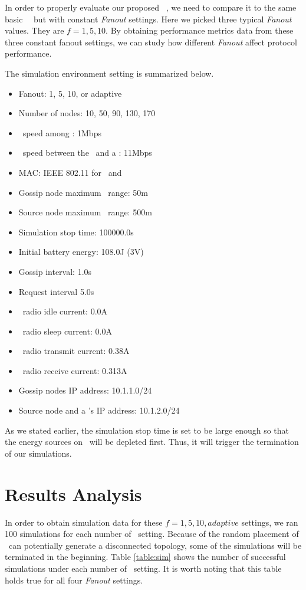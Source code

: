 In order to properly evaluate our proposed \pp ~\gp, we need to compare it to the same basic \pp ~\gp ~but with constant \emph{Fanout} settings. Here we picked three typical \emph{Fanout} values. They are $f=1, 5, 10$. By obtaining performance metrics data from these three constant fanout settings, we can study how different \emph{Fanout} affect protocol performance. 

The simulation environment setting is summarized below.

\begin{itemize}
	\item Fanout: 1, 5, 10, or adaptive
	\item Number of nodes: 10, 50, 90, 130, 170
	\item \wf ~speed among \gns: 1Mbps
	\item \wf ~speed between the \sn ~and a \gn: 11Mbps
	\item MAC: IEEE 802.11 for \gns ~and \sn
	\item Gossip node maximum \wf ~range: 50m
	\item Source node maximum \wf ~range: 500m
	\item Simulation stop time: 100000.0s
	\item Initial battery energy: 108.0J  (3V)
	\item Gossip interval: 1.0s
	\item Request interval 5.0s
	\item \wf ~radio idle current: 0.0A
	\item \wf ~radio sleep current: 0.0A
	\item \wf ~radio transmit current: 0.38A
	\item \wf ~radio receive current: 0.313A
	\item Gossip nodes IP address: 10.1.1.0/24
	\item Source node and a \gn's IP address: 10.1.2.0/24	
\end{itemize}

As we stated earlier, the simulation stop time is set to be large enough so that the energy sources on \gns ~will be depleted first. Thus, it will trigger the termination of our simulations. 

\section{Results Analysis}

In order to obtain simulation data for these $f=1,5,10, adaptive$ settings, we ran 100 simulations for each number of \gns ~setting. Because of the random placement of \gns ~can potentially generate a disconnected topology, some of the simulations will be terminated in the beginning. Table \ref{table:sim} shows the number of successful simulations under each number of \gns ~setting. It is worth noting that this table holds true for all four \emph{Fanout} settings.

